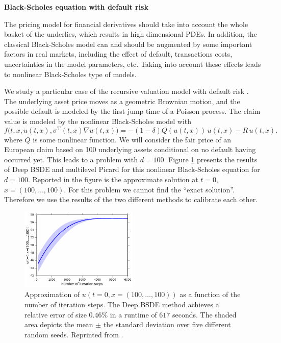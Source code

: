 \documentclass[12pt,AutoFakeBold,AutoFakeSlant]{article}
\theoremstyle{definition}
\begin{document}
	\vspace{.1in}
	\noindent
	{\bf Black-Scholes equation with default risk}

	The pricing model for financial derivatives  should take into account the whole basket of the underlies, which results in high dimensional PDEs.  In addition, 
	the classical Black-Scholes model can and should be augmented by some important factors in real markets, including the 
	effect of default, transactions costs, uncertainties in the model parameters, etc.
	Taking into account these effects leads to nonlinear Black-Scholes type of models.

	We study a particular case of the recursive valuation model with default risk \cite{Duffie1996, Bender2017}. 
	The underlying asset price moves as a geometric Brownian motion, and the possible default is modeled by the first jump time of a Poisson process.
	The claim value is modeled by the nonlinear Black-Scholes model with
		\begin{equation}
		f\big( t, x, u(t,x), \sigma^{\operatorname{T}}( t, x ) \nabla u( t, x ) \big)
		= - \left( 1 - \delta \right) Q( u(t,x) ) \, u(t,x) - R \, u(t,x).
		\end{equation}
	where $Q$ is some nonlinear function. %
	We will consider the fair price of an European claim based on 100 underlying assets
		conditional on no default having occurred yet.  This leads to a problem with $d=100$.
	Figure \ref{fig:BlackScholes} presents the results of Deep BSDE and multilevel Picard for this nonlinear Black-Scholes equation
	for $d=100$.
	Reported in the figure is the approximate solution at $t=0, $ $x=(100,\dots, 100)$.
	For this problem we cannot find the ``exact solution''. Therefore we use the results of the two different methods to
	calibrate each other.
	\begin{figure}[H]
	\centering
	\includegraphics[width=0.5\textwidth]{./figs/PricingDefaultRisk_d100_uinit}
	\caption{Approximation of $u(t{=}0,x{=}(100,\dots,100))$ as a function of the  number of iteration steps.
	The Deep BSDE method achieves a relative error of size $ 0.46\% $ in a runtime of $ 617 $ seconds.
	The shaded area depicts the mean $\pm$ the standard deviation over five different random seeds. 
	Reprinted from \cite{HanJentzenE2018}.
	}
	\label{fig:BlackScholes}
	\end{figure}
	
\end{document}
